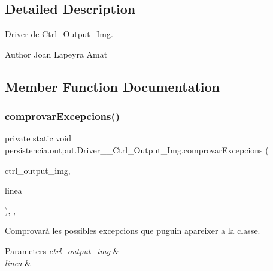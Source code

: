 \subsection{Detailed Description}
Driver de \hyperlink{classpersistencia_1_1output_1_1Ctrl__Output__Img}{Ctrl\+\_\+\+Output\+\_\+\+Img}. 

\begin{DoxyAuthor}{Author}
Joan Lapeyra Amat 
\end{DoxyAuthor}


\subsection{Member Function Documentation}
\mbox{\label{classpersistencia_1_1output_1_1Driver____Ctrl__Output__Img_ab6af9c875a2582dbb7e466be9bb6bbbb}} 
\subsubsection{\texorpdfstring{comprovar\+Excepcions()}{comprovarExcepcions()}}
{\footnotesize\ttfamily private static void persistencia.\+output.\+Driver\+\_\+\+\_\+\+Ctrl\+\_\+\+Output\+\_\+\+Img.\+comprovar\+Excepcions (\begin{DoxyParamCaption}\item[{\hyperlink{classpersistencia_1_1output_1_1Ctrl__Output__Img}{Ctrl\+\_\+\+Output\+\_\+\+Img}}]{ctrl\+\_\+output\+\_\+img,  }\item[{String}]{linea }\end{DoxyParamCaption})\hspace{0.3cm}{\ttfamily [inline]}, {\ttfamily [static]}, {\ttfamily [private]}}



Comprovarà les possibles excepcions que puguin apareixer a la classe. 


\begin{DoxyParams}{Parameters}
{\em ctrl\+\_\+output\+\_\+img} & \\
\hline
{\em linea} & \\
\hline
\end{DoxyParams}

